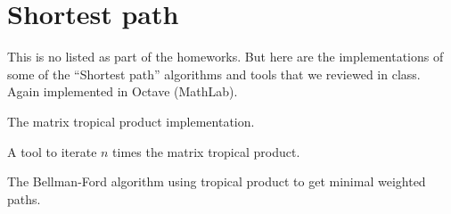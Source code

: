 \chapter{Shortest path}
\normalfont
This is no listed as part of the homeworks. But here are the implementations of some of the ``Shortest path'' algorithms and tools
that we reviewed in class. Again implemented in Octave (MathLab).\pn

The matrix tropical product implementation.
\ttfamily   

\normalfont

A tool to iterate $n$ times the matrix tropical product.
\ttfamily 

\normalfont

The Bellman-Ford algorithm using tropical product to get minimal weighted paths.
\ttfamily 

\normalfont

\itshape

